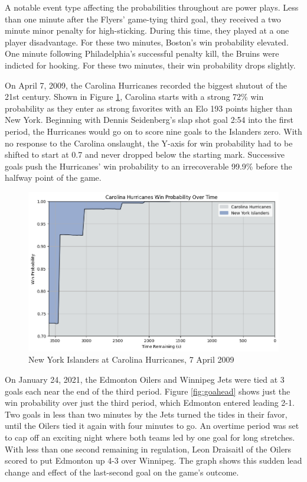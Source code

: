 \documentclass{article}
\begin{document}
A notable event type affecting the probabilities throughout are power plays.
Less than one minute after the Flyers' game-tying third goal, they received a two minute minor penalty for high-sticking.
During this time, they played at a one player disadvantage.
For these two minutes, Boston's win probability elevated.
One minute following Philadelphia's successful penalty kill, the Bruins were indicted for hooking.
For these two minutes, their win probability drops slightly.

On April 7, 2009, the Carolina Hurricanes recorded the biggest shutout of the 21st century.
Shown in Figure \ref{fig:shutout}, Carolina starts with a strong 72\% win probability as they enter as strong favorites with an Elo 193 points higher than New York.
Beginning with Dennis Seidenberg's slap shot goal 2:54 into the first period, the Hurricanes would go on to score nine goals to the Islanders zero.
With no response to the Carolina onslaught, the Y-axis for win probability had to be shifted to start at 0.7 and never dropped below the starting mark.
Successive goals push the Hurricanes' win probability to an irrecoverable 99.9\% before the halfway point of the game.

\begin{figure}
    \centering
    \includegraphics[width=1.0\linewidth]{2008021187.png}
    \caption{New York Islanders at Carolina Hurricanes, 7 April 2009}
    \label{fig:shutout}
\end{figure}

On January 24, 2021, the Edmonton Oilers and Winnipeg Jets were tied at 3 goals each near the end of the third period.
Figure \ref{fig:goahead} shows just the win probability over just the third period, which Edmonton entered leading 2-1.
Two goals in less than two minutes by the Jets turned the tides in their favor, until the Oilers tied it again with four minutes to go.
An overtime period was set to cap off an exciting night where both teams led by one goal for long stretches.
With less than one second remaining in regulation, Leon Draisaitl of the Oilers scored to put Edmonton up 4-3 over Winnipeg.
The graph shows this sudden lead change and effect of the last-second goal on the game's outcome.
\end{document}
